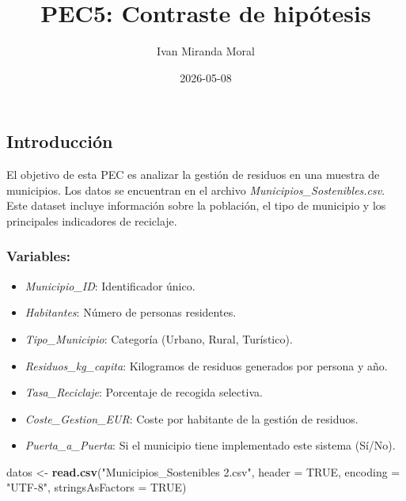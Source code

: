 \documentclass[
]{article}
\title{PEC5: Contraste de hipótesis}
\author{Ivan Miranda Moral}
\date{2026-05-08}
\newenvironment{Shaded}{\begin{snugshade}}{\end{snugshade}}
\newcommand{\AttributeTok}[1]{\textcolor[rgb]{0.13,0.29,0.53}{#1}}
\newcommand{\ConstantTok}[1]{\textcolor[rgb]{0.56,0.35,0.01}{#1}}
\newcommand{\FunctionTok}[1]{\textcolor[rgb]{0.13,0.29,0.53}{\textbf{#1}}}
\newcommand{\NormalTok}[1]{#1}
\newcommand{\OtherTok}[1]{\textcolor[rgb]{0.56,0.35,0.01}{#1}}
\newcommand{\StringTok}[1]{\textcolor[rgb]{0.31,0.60,0.02}{#1}}
\providecommand{\tightlist}{%
  \setlength{\itemsep}{0pt}\setlength{\parskip}{0pt}}
\begin{document}
\maketitle

\subsection{Introducción}\label{introducciuxf3n}

El objetivo de esta PEC es analizar la gestión de residuos en una
muestra de municipios. Los datos se encuentran en el archivo
\emph{Municipios\_Sostenibles.csv}. Este dataset incluye información
sobre la población, el tipo de municipio y los principales indicadores
de reciclaje.

\subsubsection{Variables:}\label{variables}

\begin{itemize}
\tightlist
\item
  \emph{Municipio\_ID}: Identificador único.
\item
  \emph{Habitantes}: Número de personas residentes.
\item
  \emph{Tipo\_Municipio}: Categoría (Urbano, Rural, Turístico).
\item
  \emph{Residuos\_kg\_capita}: Kilogramos de residuos generados por
  persona y año.
\item
  \emph{Tasa\_Reciclaje}: Porcentaje de recogida selectiva.
\item
  \emph{Coste\_Gestion\_EUR}: Coste por habitante de la gestión de
  residuos.
\item
  \emph{Puerta\_a\_Puerta}: Si el municipio tiene implementado este
  sistema (Sí/No).
\end{itemize}

\begin{Shaded}
\begin{Highlighting}[]
\NormalTok{datos }\OtherTok{\textless{}{-}} \FunctionTok{read.csv}\NormalTok{(}\StringTok{"Municipios\_Sostenibles 2.csv"}\NormalTok{,}
                  \AttributeTok{header =} \ConstantTok{TRUE}\NormalTok{, }\AttributeTok{encoding =} \StringTok{"UTF{-}8"}\NormalTok{,}
                  \AttributeTok{stringsAsFactors =} \ConstantTok{TRUE}\NormalTok{)}
\end{Highlighting}
\end{Shaded}
\end{document}
